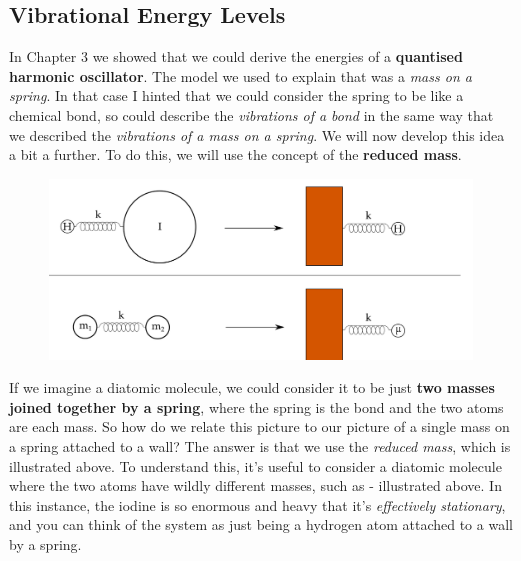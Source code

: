 \documentclass{memoir}[11pt,oneside,a4paper,openany]
\begin{document}
\subsection{Vibrational Energy Levels}
In Chapter 3 we showed that we could derive the energies of a \textbf{quantised harmonic oscillator}. The model we used to explain that was a \emph{mass on a spring}. In that case I hinted that we could consider the spring to be like a chemical bond, so could describe the \emph{vibrations of a bond} in the same way that we described the \emph{vibrations of a mass on a spring}. We will now develop this idea a bit a further. To do this, we will use the concept of the \textbf{reduced mass}. 
\begin{figure}[h]
	\centering
	\includegraphics[width=\textwidth]{reduced_masses}
\end{figure}
If we imagine a diatomic molecule, we could consider it to be just \textbf{two masses joined together by a spring}, where the spring is the bond and the two atoms are each mass. So how do we relate this picture to our picture of a single mass on a spring attached to a wall? The answer is that we use the \emph{reduced mass}, which is illustrated above. To understand this, it's useful to consider a diatomic molecule where the two atoms have wildly different masses, such as  - illustrated above. In this instance, the iodine is so enormous and heavy that it's \emph{effectively stationary}, and you can think of the system as just being a hydrogen atom attached to a wall by a spring. 
\end{document}
